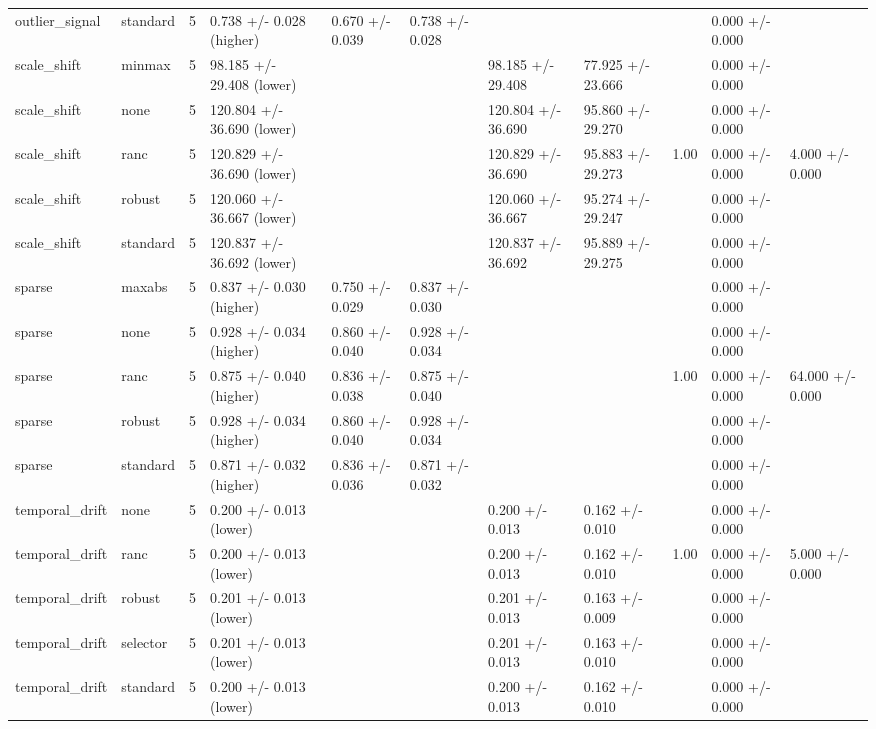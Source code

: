 \begin{tabular}{lllllllllll}
outlier\_signal & standard & 5 & 0.738 +/- 0.028 (higher) & 0.670 +/- 0.039 & 0.738 +/- 0.028 &  &  &  & 0.000 +/- 0.000 &  \\
scale\_shift & minmax & 5 & 98.185 +/- 29.408 (lower) &  &  & 98.185 +/- 29.408 & 77.925 +/- 23.666 &  & 0.000 +/- 0.000 &  \\
scale\_shift & none & 5 & 120.804 +/- 36.690 (lower) &  &  & 120.804 +/- 36.690 & 95.860 +/- 29.270 &  & 0.000 +/- 0.000 &  \\
scale\_shift & ranc & 5 & 120.829 +/- 36.690 (lower) &  &  & 120.829 +/- 36.690 & 95.883 +/- 29.273 & 1.00 & 0.000 +/- 0.000 & 4.000 +/- 0.000 \\
scale\_shift & robust & 5 & 120.060 +/- 36.667 (lower) &  &  & 120.060 +/- 36.667 & 95.274 +/- 29.247 &  & 0.000 +/- 0.000 &  \\
scale\_shift & standard & 5 & 120.837 +/- 36.692 (lower) &  &  & 120.837 +/- 36.692 & 95.889 +/- 29.275 &  & 0.000 +/- 0.000 &  \\
sparse & maxabs & 5 & 0.837 +/- 0.030 (higher) & 0.750 +/- 0.029 & 0.837 +/- 0.030 &  &  &  & 0.000 +/- 0.000 &  \\
sparse & none & 5 & 0.928 +/- 0.034 (higher) & 0.860 +/- 0.040 & 0.928 +/- 0.034 &  &  &  & 0.000 +/- 0.000 &  \\
sparse & ranc & 5 & 0.875 +/- 0.040 (higher) & 0.836 +/- 0.038 & 0.875 +/- 0.040 &  &  & 1.00 & 0.000 +/- 0.000 & 64.000 +/- 0.000 \\
sparse & robust & 5 & 0.928 +/- 0.034 (higher) & 0.860 +/- 0.040 & 0.928 +/- 0.034 &  &  &  & 0.000 +/- 0.000 &  \\
sparse & standard & 5 & 0.871 +/- 0.032 (higher) & 0.836 +/- 0.036 & 0.871 +/- 0.032 &  &  &  & 0.000 +/- 0.000 &  \\
temporal\_drift & none & 5 & 0.200 +/- 0.013 (lower) &  &  & 0.200 +/- 0.013 & 0.162 +/- 0.010 &  & 0.000 +/- 0.000 &  \\
temporal\_drift & ranc & 5 & 0.200 +/- 0.013 (lower) &  &  & 0.200 +/- 0.013 & 0.162 +/- 0.010 & 1.00 & 0.000 +/- 0.000 & 5.000 +/- 0.000 \\
temporal\_drift & robust & 5 & 0.201 +/- 0.013 (lower) &  &  & 0.201 +/- 0.013 & 0.163 +/- 0.009 &  & 0.000 +/- 0.000 &  \\
temporal\_drift & selector & 5 & 0.201 +/- 0.013 (lower) &  &  & 0.201 +/- 0.013 & 0.163 +/- 0.010 &  & 0.000 +/- 0.000 &  \\
temporal\_drift & standard & 5 & 0.200 +/- 0.013 (lower) &  &  & 0.200 +/- 0.013 & 0.162 +/- 0.010 &  & 0.000 +/- 0.000 &  \\
\bottomrule
\end{tabular}

